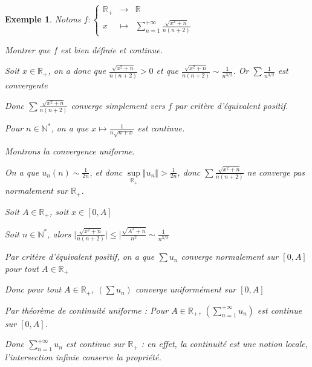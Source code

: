 \documentclass[a4paper,12pt]{book}
\newtheorem{Exe}{Exemple}[section]
\def\R{\mathbb{R}}
\def\N{\mathbb{N}}
\begin{document}
\begin{Exe}
Notons $f:\left\{\begin{array}{rcl} \R_+ & \to & \R \\ x & \mapsto & \sum\limits_{n=1}^{+\infty}\frac{\sqrt{x^2+n}}{n(n+2)}\end{array}\right.$ \par Montrer que $f$ est bien définie et continue. \par Soit $x\in\R_+$, on a donc que $\frac{\sqrt{x^2+n}}{n(n+2)}>0$ et que $\frac{\sqrt{x^2+n}}{n(n+2)}\sim\frac{1}{n^{3/2}}$. Or $\sum \frac{1}{n^{3/2}}$ est convergente \par Donc $\sum\frac{\sqrt{x^2+n}}{n(n+2)}$ converge simplement vers $f$ par critère d'équivalent positif. \par Pour $n\in\N^*$, on a que $x\mapsto \frac{1}{n\sqrt{n+x}}$ est continue.\par Montrons la convergence uniforme.
\par On a que $u_n(n)\sim\frac{1}{2n}$, et donc $\sup\limits_{\R_+}\Vert u_n\Vert>\frac{1}{2n}$, donc $\sum \frac{\sqrt{x^2+n}}{n(n+2)}$ ne converge pas normalement sur $\R_+$. \par Soit $A\in\R_+$, soit $x\in [0,A]$ \par Soit $n\in\N^*$, alors $\vert \frac{\sqrt{x^2+n}}{n(n+2)}\vert\leq \vert\frac{\sqrt{A^2+n}}{n^2}\sim \frac{1}{n^{3/2}}$ \par Par critère d'équivalent positif, on a que $\sum u_n$ converge normalement sur $[0,A]$ pour tout $A\in\R_+$ \par Donc pour tout $A\in\R_+$, $(\sum u_n)$ converge uniformément sur $[0,A]$ \par Par théorème de continuité uniforme : Pour $A\in\R_+$, $(\sum\limits_{n=1}^{+\infty}u_n)$ est continue sur $[0,A]$.
\par Donc $\sum\limits_{n=1}^{+\infty}u_n$ est continue sur $\R_+$ : en effet, la continuité est une notion locale, l'intersection infinie conserve la propriété.
\end{Exe}
\end{document}
